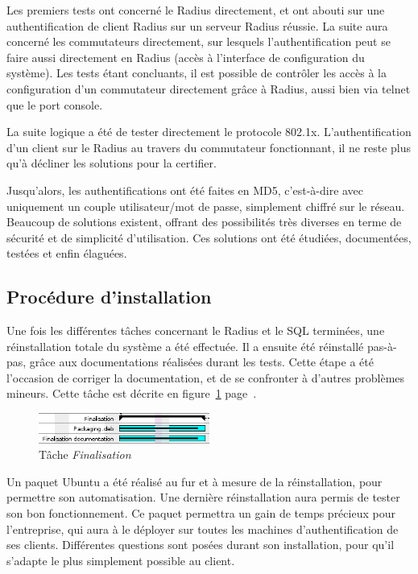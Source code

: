 Les premiers tests ont concerné le Radius directement, et ont abouti sur une authentification de client Radius sur un serveur Radius réussie. La suite aura concerné les commutateurs directement, sur lesquels l'authentification peut se faire aussi directement en Radius (accès à l'interface de configuration du système). Les tests étant concluants, il est possible de contrôler les accès à la configuration d'un commutateur directement grâce à Radius, aussi bien via telnet que le port console.

La suite logique a été de tester directement le protocole 802.1x. L'authentification d'un client sur le Radius au travers du commutateur fonctionnant, il ne reste plus qu'à décliner les solutions pour la certifier.

Jusqu'alors, les authentifications ont été faites en MD5, c'est-à-dire avec uniquement un couple utilisateur/mot de passe, simplement chiffré sur le réseau. Beaucoup de solutions existent, offrant des possibilités très diverses en terme de sécurité et de simplicité d'utilisation. Ces solutions ont été étudiées, documentées, testées et enfin élaguées.

\subsection{Procédure d'installation}

Une fois les différentes tâches concernant le Radius et le SQL terminées, une réinstallation totale du système a été effectuée. Il a ensuite été réinstallé pas-à-pas, grâce aux documentations réalisées durant les tests. Cette étape a été l'occasion de corriger la documentation, et de se confronter à d'autres problèmes mineurs. Cette tâche est décrite en figure~\ref{gantt_finalisation} page~\pageref{gantt_finalisation}.

\begin{figure}[!h]
	\begin{center}
		\includegraphics[width=0.5\textwidth]{img/gantt_finalisation.png}
	\end{center}
	\caption{Tâche \textit{Finalisation}}
	\label{gantt_finalisation}
\end{figure}

Un paquet Ubuntu a été réalisé au fur et à mesure de la réinstallation, pour permettre son automatisation. Une dernière réinstallation aura permis de tester son bon fonctionnement. Ce paquet permettra un gain de temps précieux pour l'entreprise, qui aura à le déployer sur toutes les machines d'authentification de ses clients. Différentes questions sont posées durant son installation, pour qu'il s'adapte le plus simplement possible au client.

